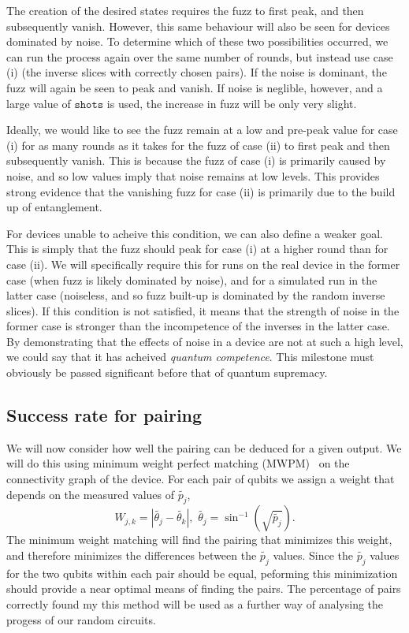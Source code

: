 \documentclass[aps,prl,twocolumn,showpacs,preprintnumbers]{revtex4-1}
\newcommand{\be}{\begin{equation}}
\newcommand{\ee}{\end{equation}}
\begin{document}
The creation of the desired states requires the fuzz to first peak, and then subsequently vanish. However, this same behaviour will also be seen for devices dominated by noise. To determine which of these two possibilities occurred, we can run the process again over the same number of rounds, but instead use case (i) (the inverse slices with correctly chosen pairs). If the noise is dominant, the fuzz will again be seen to peak and vanish. If noise is neglible, however, and a large value of $\mathtt{shots}$ is used, the increase in fuzz will be only very slight.

Ideally, we would like to see the fuzz remain at a low and pre-peak value for case (i) for as many rounds as it takes for the fuzz of case (ii) to first peak and then subsequently vanish. This is because the fuzz of case (i) is primarily caused by noise, and so low values imply that noise remains at low levels. This provides strong evidence that the vanishing fuzz for case (ii) is primarily due to the build up of entanglement.

For devices unable to acheive this condition, we can also define a weaker goal. This is simply that the fuzz should peak for case (i) at a higher round than for case (ii). We will specifically require this for runs on the real device in the former case (when fuzz is likely dominated by noise), and for a simulated run in the latter case (noiseless, and so fuzz built-up is dominated by the random inverse slices). If this condition is not satisfied, it means that the strength of noise in the former case is stronger than the incompetence of the inverses in the latter case. By demonstrating that the effects of noise in a device are not at such a high level, we could say that it has acheived \textit{quantum competence}. This milestone must obviously be passed significant before that of quantum supremacy.


\subsection{Success rate for pairing}

We will now consider how well the pairing can be deduced for a given output. We will do this using minimum weight perfect matching (MWPM)~\cite{} on the connectivity graph of the device. For each pair of qubits we assign a weight that depends on the measured values of $\tilde{p_j}$,
\be \label{angle}
W_{j,k} = | \tilde{\theta_j} - \tilde{\theta_k} |, \,\, \tilde{\theta_j} = \sin^{-1}( \sqrt{\tilde{p_j}} ).
\ee
The minimum weight matching will find the pairing that minimizes this weight, and therefore minimizes the differences between the $\tilde{p_j}$ values. Since the $\tilde{p_j}$ values for the two qubits within each pair should be equal, peforming this minimization should provide a near optimal means of finding the pairs. The percentage of pairs correctly found my this method will be used as a further way of analysing the progess of our random circuits.
\end{document}
